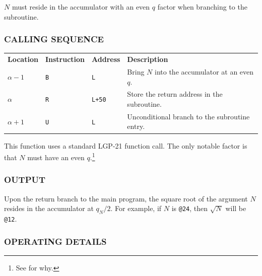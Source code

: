 \documentclass{article}
\begin{document}
\noindent
$N$ must reside in the accumulator with an even $q$ factor when branching to the subroutine.

\subsubsection*{CALLING SEQUENCE}
\noindent
\begin{tabular}{llll}
\textbf{Location} & \textbf{Instruction} & \textbf{Address} & \textbf{Description} \\
$\alpha-1$      & \texttt{B}            & \texttt{L}       & Bring $N$ into the accumulator at an even $q$. \\
$\alpha$       & \texttt{R}            & \texttt{L+50}    & Store the return address in the subroutine. \\
$\alpha+1$      & \texttt{U}            & \texttt{L}       & Unconditional branch to the subroutine entry. \\
\end{tabular}

\medskip
\noindent
This function uses a standard LGP-21 function call. The only notable factor is that $N$ must have an even $q$.\footnote{See \label{subsub:halfQ} for why.}

\subsubsection*{OUTPUT}
\noindent
Upon the return branch to the main program, the square root of the argument $N$ resides in the accumulator at $q_N / 2$. For example, if $N$ is \texttt{@24}, then $\sqrt{N}$ will be \texttt{@12}.

\subsubsection*{OPERATING DETAILS}
\end{document}
